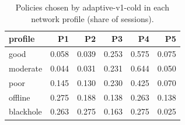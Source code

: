 \begin{table}[htbp]
\centering
\small
\caption{Policies chosen by adaptive-v1-cold in each network profile (share of sessions).}
\label{tab:policy_share_adaptive_v1_cold}
\begin{tabular}{l r r r r r}
\toprule
profile & P1 & P2 & P3 & P4 & P5 \\
\midrule
good & 0.058 & 0.039 & 0.253 & 0.575 & 0.075 \\
moderate & 0.044 & 0.031 & 0.231 & 0.644 & 0.050 \\
poor & 0.145 & 0.130 & 0.230 & 0.425 & 0.070 \\
offline & 0.275 & 0.188 & 0.138 & 0.263 & 0.138 \\
blackhole & 0.263 & 0.275 & 0.163 & 0.275 & 0.025 \\
\bottomrule
\end{tabular}
\end{table}
